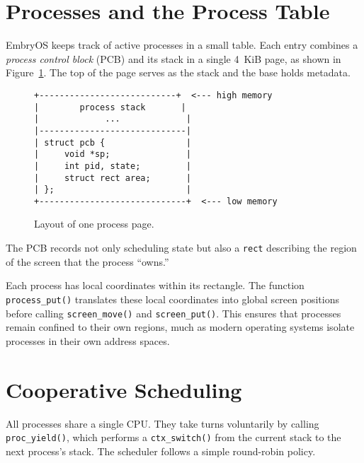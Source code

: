 \section{Processes and the Process Table}

EmbryOS keeps track of active processes in a small table.  Each entry combines
a \emph{process control block} (PCB) and its stack in a single 4~KiB page, as
shown in Figure~\ref{fig:pcb_layout}.  The top of the page serves as the stack
and the base holds metadata.

\begin{figure}[H]
\centering
\begin{verbatim}
+---------------------------+  <--- high memory
|        process stack       |
|             ...             |
|-----------------------------|
| struct pcb {                |
|     void *sp;               |
|     int pid, state;         |
|     struct rect area;       |
| };                          |
+-----------------------------+  <--- low memory
\end{verbatim}
\caption{Layout of one process page.}
\label{fig:pcb_layout}
\end{figure}

\noindent
The PCB records not only scheduling state but also a \texttt{rect}
describing the region of the screen that the process ``owns.''

\begin{figure}[H]
\centering
\begin{minipage}{0.9\textwidth}

\end{minipage}
\end{figure}

Each process has local coordinates within its rectangle.
The function \texttt{process\_put()} translates these local coordinates into
global screen positions before calling \texttt{screen\_move()} and
\texttt{screen\_put()}.  This ensures that processes remain confined to their
own regions, much as modern operating systems isolate processes in their own
address spaces.

\section{Cooperative Scheduling}

All processes share a single CPU.  They take turns voluntarily by calling
\texttt{proc\_yield()}, which performs a \texttt{ctx\_switch()} from the
current stack to the next process's stack.  The scheduler follows a simple
round-robin policy.


